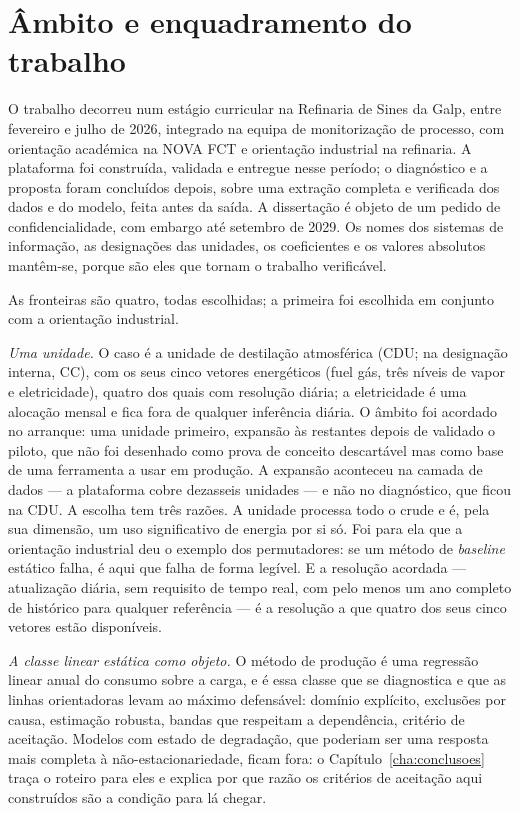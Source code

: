 \section{Âmbito e enquadramento do trabalho}
\label{sec:ambito}

O trabalho decorreu num estágio curricular na Refinaria de Sines da
Galp, entre fevereiro e julho de 2026, integrado na equipa de
monitorização de processo, com orientação académica na NOVA FCT e
orientação industrial na refinaria. A
plataforma foi construída, validada e entregue nesse período; o
diagnóstico e a proposta foram concluídos depois, sobre uma extração
completa e verificada dos dados e do modelo, feita antes da saída. A
dissertação é objeto de um pedido de confidencialidade, com embargo até
setembro de 2029. Os nomes dos sistemas de informação, as designações
das unidades, os coeficientes e os valores absolutos mantêm-se, porque
são eles que tornam o trabalho verificável.

As fronteiras são quatro, todas escolhidas; a primeira foi escolhida em
conjunto com a orientação industrial.

\emph{Uma unidade.} O caso é a unidade de destilação atmosférica (CDU;
na designação interna, CC), com os seus cinco vetores energéticos (fuel
gás, três níveis de vapor e eletricidade), quatro dos quais com
resolução diária; a eletricidade é uma alocação mensal e fica fora de
qualquer inferência diária. O âmbito foi acordado no arranque: uma
unidade primeiro, expansão às restantes depois de validado o piloto, que
não foi desenhado como prova de conceito descartável mas como base de
uma ferramenta a usar em produção. A expansão aconteceu na camada de
dados --- a plataforma cobre dezasseis unidades --- e não no diagnóstico,
que ficou na CDU. A escolha tem três razões. A unidade processa todo o
crude e é, pela sua dimensão, um uso significativo de energia por si
só. Foi para ela que a orientação industrial deu o exemplo dos
permutadores: se um método de \emph{baseline} estático falha, é aqui que
falha de forma legível. E a resolução acordada --- atualização diária,
sem requisito de tempo real, com pelo menos um ano completo de histórico
para qualquer referência --- é a resolução a que quatro dos seus cinco
vetores estão disponíveis.

\emph{A classe linear estática como objeto.} O método de produção é uma
regressão linear anual do consumo sobre a carga, e é essa classe que se
diagnostica e que as linhas orientadoras levam ao máximo defensável:
domínio explícito, exclusões por causa, estimação robusta, bandas que
respeitam a dependência, critério de aceitação. Modelos com estado de
degradação, que poderiam ser uma resposta mais completa à não-estacionariedade,
ficam fora: o Capítulo~\ref{cha:conclusoes} traça o roteiro para eles e
explica por que razão os critérios de aceitação aqui construídos são a
condição para lá chegar.

